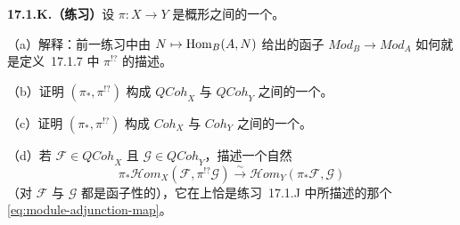 \textbf{17.1.K.（练习）}\quad 设 $\pi\colon X\to Y$ 是\trLocally\trNoetherian{}概形之间的一个\trFinite\trMorphism。

（a）解释：前一练习中由 $N\mapsto\operatorname{Hom}_B(A,N)$ 给出的函子 $\mathit{Mod}_B\to\mathit{Mod}_A$ 如何就是\mbox{定义~17.1.7} 中 $\pi^{!?}$ 的\trAffineLocal{}描述。

（b）证明 $(\pi_*,\pi^{!?})$ 构成 $\mathit{QCoh}_X$ 与 $\mathit{QCoh}_Y$ 之间的一个\trAdjointPair。

（c）证明 $(\pi_*,\pi^{!?})$ 构成 $\mathit{Coh}_X$ 与 $\mathit{Coh}_Y$ 之间的一个\trAdjointPair。

（d）若 $\mathscr{F}\in\mathit{QCoh}_X$ 且 $\mathscr{G}\in\mathit{QCoh}_Y$，描述一个自然\trIsomorphism
\begin{equation*}\tag{17.1.8.2}\label{eq:sheaf-adjunction-isomorphism}
\pi_*\mathscr{H}om_X(\mathscr{F},\pi^{!?}\mathscr{G})\overset{\sim}{\longrightarrow}\mathscr{H}om_Y(\pi_*\mathscr{F},\mathscr{G})
\end{equation*}
（对 $\mathscr{F}$ 与 $\mathscr{G}$ 都是函子性的），它在\trAffineLocal{}上恰是\mbox{练习~17.1.J} 中所描述的那个\trIsomorphism{} \eqref{eq:module-adjunction-map}。
